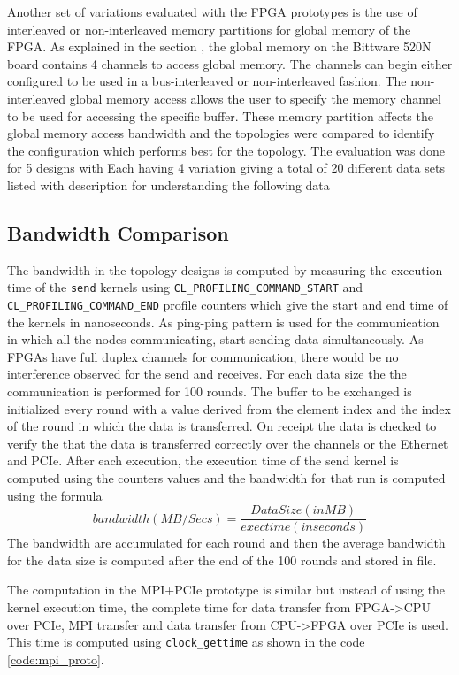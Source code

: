 Another set of variations evaluated with the FPGA prototypes is the use of
interleaved or non-interleaved memory partitions for global memory of the FPGA.
As explained in the section , the global memory on the Bittware 520N board
contains 4 channels to access global memory. The channels can begin
either configured to be used in a bus-interleaved or non-interleaved fashion.
The non-interleaved global memory access allows the user to specify the
memory channel to be used for accessing the specific buffer. These
memory partition affects the global memory access bandwidth and
the topologies were compared to identify the configuration which performs
best for the topology. The evaluation was done for 5 designs with Each
having 4 variation giving a total of 20 different data sets listed with
description for understanding the following data

\subsection{Bandwidth Comparison}

The bandwidth in the topology designs is computed by measuring the execution time
of the \texttt{send} kernels using \texttt{CL\_PROFILING\_COMMAND\_START}
and \texttt{CL\_PROFILING\_COMMAND\_END} profile counters which give the start and
end time of the kernels in nanoseconds. As ping-ping pattern is used for the
communication in which all the nodes communicating, start sending data simultaneously.
As FPGAs have full duplex channels for communication, there would be no interference
observed for the send and receives. For each data size the the communication is performed
for 100 rounds. The buffer to be exchanged is initialized every round with a value derived from the
element index and the index of the round in which the data is transferred. On receipt
the data is checked to verify the that the data is transferred correctly over the channels
or the Ethernet and PCIe. After each execution, the execution time of the send kernel
is computed using the counters values and the bandwidth for that run is computed using the formula
$$ bandwidth (MB/Secs) = \frac{Data Size (in MB)}{exectime (in seconds)} $$
The bandwidth are accumulated for each round and then the average bandwidth for the
data size is computed after the end of the 100 rounds and stored in file.

The computation in the MPI+PCIe prototype is similar but instead of using the kernel execution
time, the complete time for data transfer from FPGA->CPU over PCIe, MPI transfer and data transfer from
CPU->FPGA over PCIe is used. This time is computed using \texttt{clock\_gettime} as shown in the code
\ref{code:mpi_proto}.

